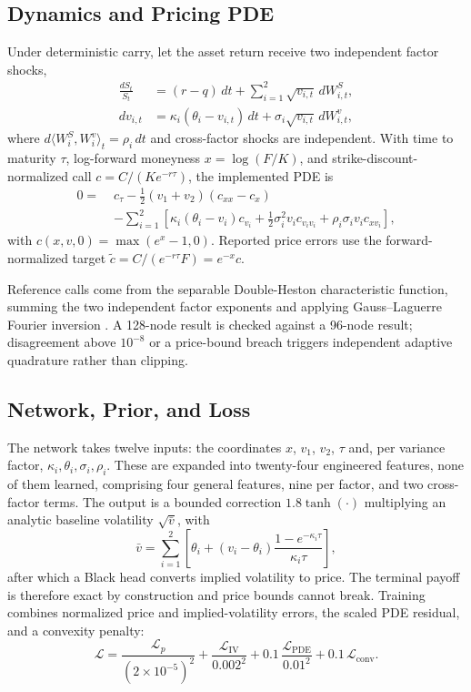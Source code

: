\documentclass[conference]{IEEEtran}
\begin{document}
\subsection{Dynamics and Pricing PDE}

Under deterministic carry, let the asset return receive two independent factor
shocks,
\begin{align}
\frac{dS_t}{S_t} &= (r-q)\,dt + \sum_{i=1}^{2}\sqrt{v_{i,t}}\,dW^{S}_{i,t},\\
dv_{i,t} &= \kappa_i(\theta_i - v_{i,t})\,dt + \sigma_i\sqrt{v_{i,t}}\,dW^{v}_{i,t},
\end{align}
where $d\langle W^{S}_i, W^{v}_i\rangle_t = \rho_i\,dt$ and cross-factor shocks
are independent. With time to maturity $\tau$, log-forward moneyness
$x=\log(F/K)$, and strike-discount-normalized call $c = C/(Ke^{-r\tau})$, the
implemented PDE is
\begin{align}
0 = \;& c_\tau - \tfrac{1}{2}(v_1+v_2)\left(c_{xx}-c_x\right) \nonumber\\
 &- \sum_{i=1}^{2}\left[\kappa_i(\theta_i-v_i)c_{v_i}
   + \tfrac{1}{2}\sigma_i^2 v_i c_{v_i v_i}
   + \rho_i \sigma_i v_i c_{x v_i}\right],
\end{align}
with $c(x,v,0)=\max(e^{x}-1,0)$. Reported price errors use the
forward-normalized target $\tilde{c}=C/(e^{-r\tau}F)=e^{-x}c$.

Reference calls come from the separable Double-Heston characteristic function,
summing the two independent factor exponents and applying Gauss--Laguerre
Fourier inversion \cite{heston1993,carr1999,lord2010}. A 128-node result is
checked against a 96-node result; disagreement above $10^{-8}$ or a price-bound
breach triggers independent adaptive quadrature rather than clipping.

\subsection{Network, Prior, and Loss}

The network takes twelve inputs: the coordinates $x$, $v_1$, $v_2$, $\tau$ and,
per variance factor, $\kappa_i,\theta_i,\sigma_i,\rho_i$. These are expanded
into twenty-four engineered features, none of them learned, comprising four
general features, nine per factor, and two cross-factor terms. The output is a
bounded correction $1.8\tanh(\cdot)$ multiplying an analytic baseline
volatility $\sqrt{\bar v}$, with
\begin{equation}
\bar v = \sum_{i=1}^{2}\left[\theta_i + (v_i-\theta_i)\frac{1-e^{-\kappa_i\tau}}{\kappa_i\tau}\right],
\end{equation}
after which a Black head converts implied volatility to price. The terminal
payoff is therefore exact by construction and price bounds cannot break.
Training combines normalized price and implied-volatility errors, the scaled
PDE residual, and a convexity penalty:
\begin{equation}
\mathcal{L} = \frac{\mathcal{L}_{p}}{(2\times10^{-5})^{2}}
 + \frac{\mathcal{L}_{\mathrm{IV}}}{0.002^{2}}
 + 0.1\,\frac{\mathcal{L}_{\mathrm{PDE}}}{0.01^{2}}
 + 0.1\,\mathcal{L}_{\mathrm{conv}} .
\end{equation}
\end{document}
